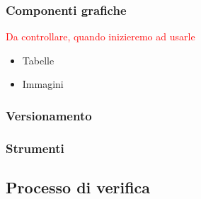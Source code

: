 \subsubsection{Componenti grafiche}
\textcolor{red}{Da controllare, quando inizieremo ad usarle}
\begin{itemize}
	\item Tabelle
	\item Immagini
\end{itemize}
\subsubsection{Versionamento}
\subsubsection{Strumenti}
\subsection{Processo di verifica}

